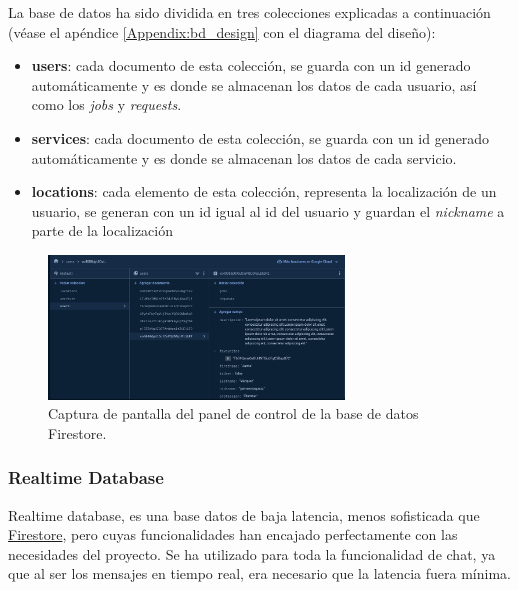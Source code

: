 La base de datos ha sido dividida en tres colecciones explicadas a continuación (véase el apéndice \ref{Appendix:bd_design} con el diagrama del diseño):
\begin{itemize}
    \item \textbf{users}: cada documento de esta colección, se guarda con un id generado automáticamente y es donde se almacenan los datos de cada usuario, así como los \textit{jobs} y \textit{requests}.
    \item \textbf{services}: cada documento de esta colección, se guarda con un id generado automáticamente y es donde se almacenan los datos de cada servicio.
    \item \textbf{locations}: cada elemento de esta colección, representa la localización de un usuario, se generan con un id igual al id del usuario y guardan el \textit{nickname} a parte de la localización
\end{itemize}
\begin{figure}[h]
    \centering
    \includegraphics[width = 0.7\textwidth]{Imagenes/Fuentes/ejemplo_firestore.png}
    \caption{Captura de pantalla del panel de control de la base de datos Firestore.}
    \label{fig:ejemplo_firestore}
\end{figure}
\hypertarget{subsec:realtime}{}
\subsubsection{Realtime Database}
Realtime database\hyperlink{cap:biblio}{}, es una base datos de baja latencia, menos sofisticada que \hyperlink{subsec:firestore}{Firestore}, pero cuyas funcionalidades han encajado perfectamente con las necesidades del proyecto. Se ha utilizado para toda la funcionalidad de chat, ya que al ser los mensajes en tiempo real, era necesario que la latencia fuera mínima. 

